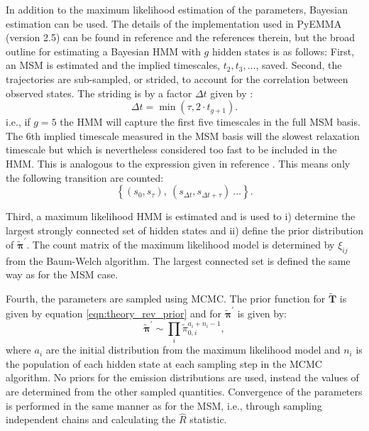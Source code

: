 In addition to the maximum likelihood estimation of the parameters, Bayesian estimation can be used. The details of the implementation used in PyEMMA (version 2.5) \cite{schererPyEMMASoftwarePackage2015a} can be found in reference \cite{choderaBayesianHiddenMarkov2011a} and the references therein, but the broad outline for estimating a Bayesian HMM with $g$ hidden states is as follows:
First, an MSM is estimated and the implied timescales, $t_{2},t_{3}, \ldots$, saved. Second, the trajectories are sub-sampled, or strided, to account for the correlation between observed states. The striding is by a factor $\Delta t$ given by \cite{schererPyEMMASoftwarePackage2015a}:
\begin{equation}\label{eqn:hmm_striding}
    \Delta t = \min{\left(\tau, 2\cdot t_{g+1}\right)}. 
\end{equation}
i.e., if $g=5$ the HMM will  capture the first five timescales in the full MSM basis. The $6$th implied timescale measured in the MSM basis will the slowest relaxation timescale but which is nevertheless considered too fast to be included in the HMM. This is analogous to the expression given in reference \cite{noeStatisticalInefficiencyMarkov}.  This means only the following transition are counted: 
\begin{equation}
    \left\{(s_{0}, s_{\tau}),\ (s_{\Delta t}, s_{\Delta t + \tau})\ \ldots \right \}.
\end{equation}

Third, a maximum likelihood HMM is estimated and is used to i) determine the largest strongly connected set of hidden states and ii) define the prior distribution of  $\widetilde{\bm{\pi}}^{\prime}$. The count matrix of the maximum likelihood model is determined by $\xi_{ij}$ from the Baum-Welch algorithm. The largest connected set is defined the same way as for the MSM case. 

Fourth, the parameters are sampled using MCMC. The prior function for $\widetilde{\mathbf{T}}$ is given by equation \ref{eqn:theory_rev_prior} and for $\widetilde{\bm{\pi}}^{\prime}$ is given by: 
\begin{equation}
    \widetilde{\bm{\pi}}^{\prime} \sim \prod_{i} \widetilde{\pi}_{0, i}^{a_{i}+n_{i}-1},
\end{equation}
where $a_{i}$ are the initial distribution from the maximum likelihood model and $n_{i}$ is the population of each hidden state at each sampling step in the MCMC algorithm. No priors for the emission distributions are used, instead the values of are determined from the other sampled quantities. Convergence of the parameters is performed in the same manner as for the MSM, i.e., through sampling independent chains and calculating the $\hat{R}$ statistic. 

